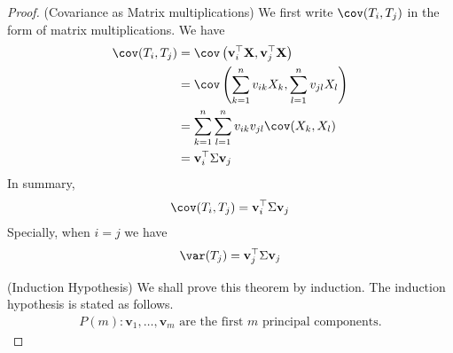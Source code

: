 \documentclass[color=blue, thmcnt=section, 12pt]{elegantbook}
\begin{document}
\begin{proof}
    (Covariance as Matrix multiplications) We first write $\cov(T_i, T_j)$ in the form of matrix multiplications. We have 
    \begin{align*}
        \cov(T_i, T_j)
        &= \cov\left(
            \mathbf{v}_i^\top \mathbf{X},
            \mathbf{v}_j^\top \mathbf{X}
        \right) \\ 
        &= \cov\left(
            \sum_{k=1}^n v_{ik} X_k,
            \sum_{l=1}^n v_{jl} X_l
        \right) \\ 
        &= \sum_{k=1}^n \sum_{l=1}^n v_{ik} v_{jl} \cov(X_k, X_l) \\ 
        &= \mathbf{v}_i^\top \Sigma \mathbf{v}_j
    \end{align*}
    In summary, 
    \begin{align*}
        \cov(T_i, T_j) = \mathbf{v}_i^\top \Sigma \mathbf{v}_j
    \end{align*}
    Specially, when $i = j$ we have
    \begin{align*}
        \var(T_j) = \mathbf{v}_j^\top \Sigma \mathbf{v}_j
    \end{align*}

    \par (Induction Hypothesis) We shall prove this theorem by induction. The induction hypothesis is stated as follows.
    \begin{align}
        P(m): \mathbf{v}_1, \ldots, \mathbf{v}_m \text{ are the first $m$ principal components.}
        \label{eq:7}
    \end{align}


\end{proof}
\end{document}
